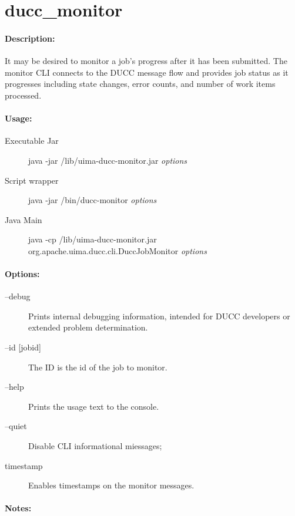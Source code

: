     \section{ducc\_monitor}

    \paragraph{Description:}
    
    It may be desired to monitor a job's progress after it has been submitted. The monitor CLI 
    connects to the DUCC message flow and provides job status as it progresses including state 
    changes, error counts, and number of work items processed. 
    
    \paragraph{Usage:}
    \begin{description}
    \item[Executable Jar] java -jar \ducchome/lib/uima-ducc-monitor.jar {\em options}
    \item[Script wrapper] java -jar \ducchome/bin/ducc-monitor {\em options}
    \item[Java Main]      java -cp \ducchome/lib/uima-ducc-monitor.jar org.apache.uima.ducc.cli.DuccJobMonitor {\em options}
    \end{description}

    \paragraph{Options:}
    \begin{description}
        \item[--debug ]          
          Prints internal debugging information, intended for DUCC developers or extended problem determination.
        \item[--id {[jobid]}]
          The ID is the id of the job to monitor.
        \item[--help]
          Prints the usage text to the console. 
        \item[--quiet] 
          Disable CLI informational miessages;
        \item[timestamp]
          Enables timestamps on the monitor messages.
     \end{description}
        
    \paragraph{Notes:}
